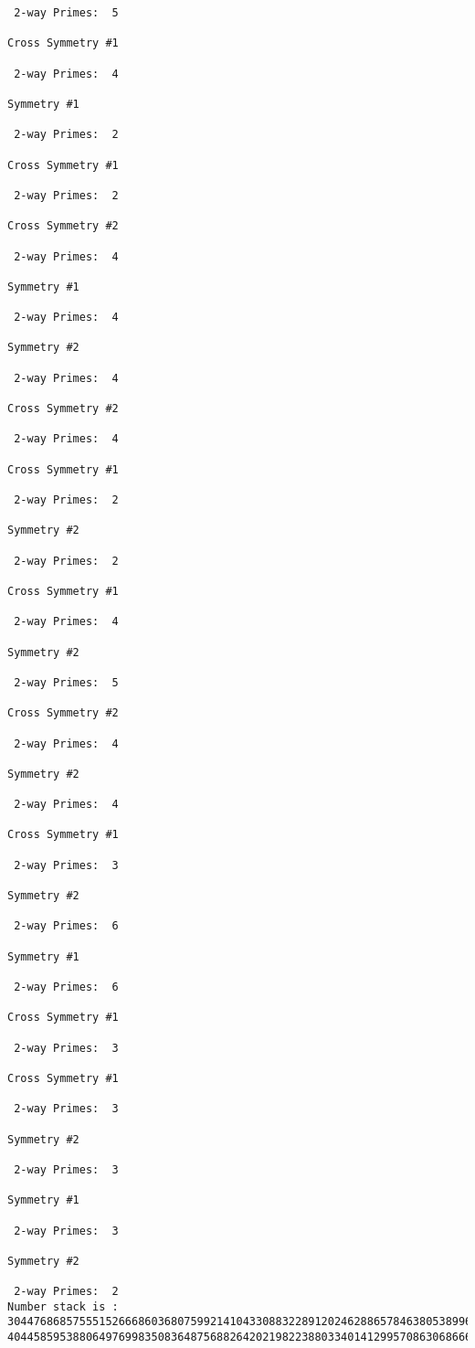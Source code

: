 \begin{verbatim}
 2-way Primes: 	5

Cross Symmetry #1

 2-way Primes: 	4

Symmetry #1

 2-way Primes: 	2

Cross Symmetry #1

 2-way Primes: 	2

Cross Symmetry #2

 2-way Primes: 	4

Symmetry #1

 2-way Primes: 	4

Symmetry #2

 2-way Primes: 	4

Cross Symmetry #2

 2-way Primes: 	4

Cross Symmetry #1

 2-way Primes: 	2

Symmetry #2

 2-way Primes: 	2

Cross Symmetry #1

 2-way Primes: 	4

Symmetry #2

 2-way Primes: 	5

Cross Symmetry #2

 2-way Primes: 	4

Symmetry #2

 2-way Primes: 	4

Cross Symmetry #1

 2-way Primes: 	3

Symmetry #2

 2-way Primes: 	6

Symmetry #1

 2-way Primes: 	6

Cross Symmetry #1

 2-way Primes: 	3

Cross Symmetry #1

 2-way Primes: 	3

Symmetry #2

 2-way Primes: 	3

Symmetry #1

 2-way Primes: 	3

Symmetry #2

 2-way Primes: 	2
Number stack is :
30447686857555152666860368075992141043308832289120246288657846380538996794608835958544046240163340857
40445859538806497699835083648756882642021982238803340141299570863068666251555758686744037580433610426


\end{verbatim}
